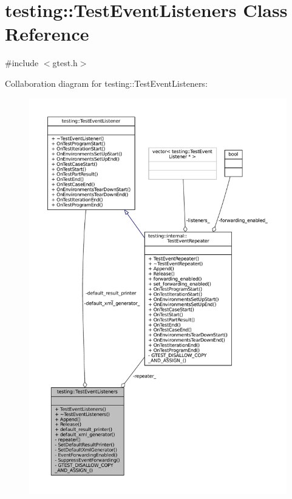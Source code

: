 \hypertarget{classtesting_1_1TestEventListeners}{}\section{testing\+:\+:Test\+Event\+Listeners Class Reference}
\label{classtesting_1_1TestEventListeners}


{\ttfamily \#include $<$gtest.\+h$>$}



Collaboration diagram for testing\+:\+:Test\+Event\+Listeners\+:
\nopagebreak
\begin{figure}[H]
\begin{center}
\leavevmode
\includegraphics[width=350pt]{classtesting_1_1TestEventListeners__coll__graph}
\end{center}
\end{figure}
